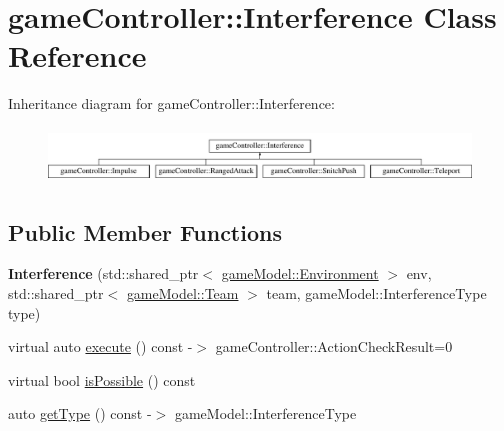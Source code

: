 \hypertarget{classgame_controller_1_1_interference}{\section{game\-Controller\-:\-:Interference Class Reference}
\label{classgame_controller_1_1_interference}
}
Inheritance diagram for game\-Controller\-:\-:Interference\-:\begin{figure}[H]
\begin{center}
\leavevmode
\includegraphics[height=1.473684cm]{classgame_controller_1_1_interference}
\end{center}
\end{figure}
\subsection*{Public Member Functions}
\begin{DoxyCompactItemize}
\item 
\hypertarget{classgame_controller_1_1_interference_a1e664266c768fafd6fc4339e08741d5a}{{\bfseries Interference} (std\-::shared\-\_\-ptr$<$ \hyperlink{classgame_model_1_1_environment}{game\-Model\-::\-Environment} $>$ env, std\-::shared\-\_\-ptr$<$ \hyperlink{classgame_model_1_1_team}{game\-Model\-::\-Team} $>$ team, game\-Model\-::\-Interference\-Type type)}\label{classgame_controller_1_1_interference_a1e664266c768fafd6fc4339e08741d5a}

\item 
virtual auto \hyperlink{classgame_controller_1_1_interference_aee66a8480fccc6286b5bef04777a8a6a}{execute} () const -\/$>$ game\-Controller\-::\-Action\-Check\-Result=0
\item 
virtual bool \hyperlink{classgame_controller_1_1_interference_a06b9adc5df035e184e7ed0cf5d4a8814}{is\-Possible} () const 
\item 
auto \hyperlink{classgame_controller_1_1_interference_a694aa2cd65bbb35c02f1ca4ed7701ebe}{get\-Type} () const -\/$>$ game\-Model\-::\-Interference\-Type
\end{DoxyCompactItemize}
